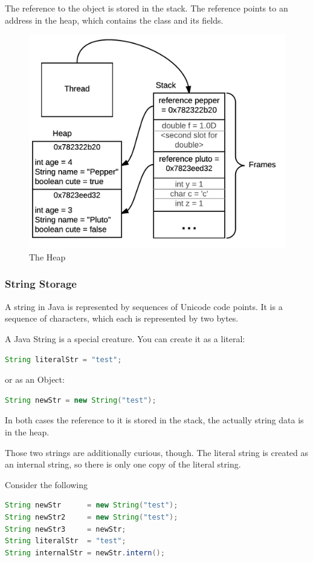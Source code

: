 The reference to the object is stored in the stack. The reference points to an address in the heap, which contains the class and its fields.\cite{gosling}
\begin{figure}[H]\centering
\includegraphics[width=0.9\linewidth, frame]{images/heap}
\caption{The Heap}
\label{fig:heap}
\end{figure}
\subsubsection{String Storage} A string in Java is represented by sequences of Unicode code points. It is a sequence of characters, which each is represented by two bytes. 

A Java String is a special creature. You can create it as a literal:
\begin{lstlisting}[language=Java]
String literalStr = "test";
\end{lstlisting}
or as an Object:
\begin{lstlisting}[language=Java]
String newStr = new String("test");
\end{lstlisting}

In both cases the reference to it is stored in the stack, the actually string data is in the heap.

Those two strings are additionally curious, though. The literal string is created as an internal string, so there is only one copy of the literal string.

Consider the following
\begin{lstlisting}[language=Java]
String newStr      = new String("test");
String newStr2     = new String("test");
String newStr3     = newStr;
String literalStr  = "test";
String internalStr = newStr.intern();
\end{lstlisting}

